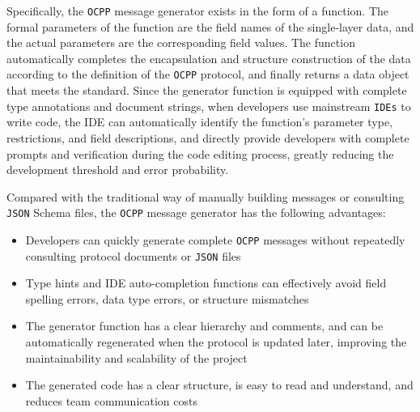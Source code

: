 \documentclass[
english,
ruledheaders=section,%
class=report,%
thesis={type=Report},%
accentcolor=9c,%
custommargins=true,%
marginpar=false,%
parskip=half-,%
fontsize=11pt,%
logofile={img/tuda_logo.pdf}, %
]{tudapub}
\begin{document}
    Specifically, the \texttt{OCPP} message generator exists in the form of a function. The formal parameters of the function are the field names of the single-layer data, and the actual parameters are the corresponding field values. The function automatically completes the encapsulation and structure construction of the data according to the definition of the \texttt{OCPP} protocol, and finally returns a data object that meets the standard. Since the generator function is equipped with complete type annotations and document strings, when developers use mainstream \texttt{IDEs} to write code, the IDE can automatically identify the function's parameter type, restrictions, and field descriptions, and directly provide developers with complete prompts and verification during the code editing process, greatly reducing the development threshold and error probability.


    Compared with the traditional way of manually building messages or consulting \texttt{JSON} Schema files, the \texttt{OCPP} message generator has the following advantages:
    \begin{itemize}
        \item Developers can quickly generate complete \texttt{OCPP} messages without repeatedly consulting protocol documents or  \texttt{JSON} files
        \item Type hints and IDE auto-completion functions can effectively avoid field spelling errors, data type errors, or structure mismatches
        \item The generator function has a clear hierarchy and comments, and can be automatically regenerated when the protocol is updated later, improving the maintainability and scalability of the project
        \item The generated code has a clear structure, is easy to read and understand, and reduces team communication costs
    \end{itemize}
\end{document}
